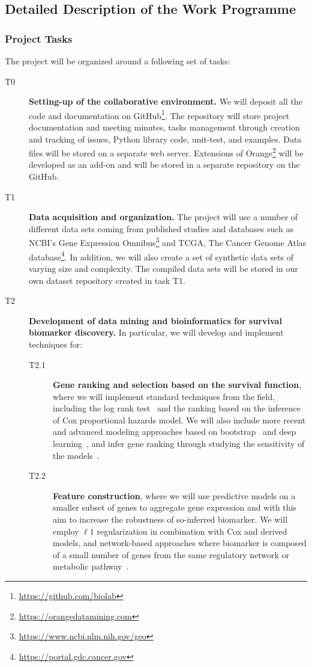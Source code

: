 \documentclass[11pt,a4paper]{article}
\newcommand{\myurl}[1]{\footnote{\url{#1}}}
\renewcommand{\bold}{\textbf}
\begin{document}
\subsection{Detailed Description of the Work Programme}

\subsubsection{Project Tasks}

The project will be organized around a following set of tasks:
\begin{description}
	\item[T0] \bold{Setting-up of the collaborative environment.} We will deposit all the code and documentation on GitHub\myurl{https://github.com/biolab}. The repository will store project documentation and meeting minutes, tasks management through creation and tracking of issues, Python library code, unit-test, and examples. Data files will be stored on a separate web server. Extensions of Orange\myurl{https://orangedatamining.com} will be developed as an add-on and will be stored in a separate repository on the GitHub.
	\item[T1] \bold{Data acquisition and organization.} The project will use a number of different data sets coming from published studies and databases such as NCBI's Gene Expression Omnibus\myurl{https://www.ncbi.nlm.nih.gov/geo} and TCGA, The Cancer Genome Atlas database\myurl{https://portal.gdc.cancer.gov}. In addition, we will also create a set of synthetic data sets of varying size and complexity. The compiled data sets will be stored in our own dataset repository created in task T1.
	\item[T2] \bold{Development of data mining and bioinformatics for survival biomarker discovery.} In particular, we will develop and implement techniques for:
	\begin{description}
		\item[T2.1] \bold{Gene ranking and selection based on the survival function}, where we will implement standard techniques from the field, including the log rank test~\cite{} and the ranking based on the inference of Cox proportional hazards model. We will also include more recent and advanced modeling approaches based on bootstrap~\cite{} and deep learning~\cite{}, and infer gene ranking through studying the sensitivity of the models~\cite{}.
		\item[T2.2] \bold{Feature construction}, where we will use predictive models on a smaller subset of genes to aggregate gene expression and with this aim to increase the robustness of so-inferred biomarker. We will employ $\ell 1$ regularization in combination with Cox and derived models, and network-based approaches where biomarker is composed of a small number of genes from the same regulatory network or metabolic pathway~\cite{}.

\end{description}
\end{description}
\end{document}
